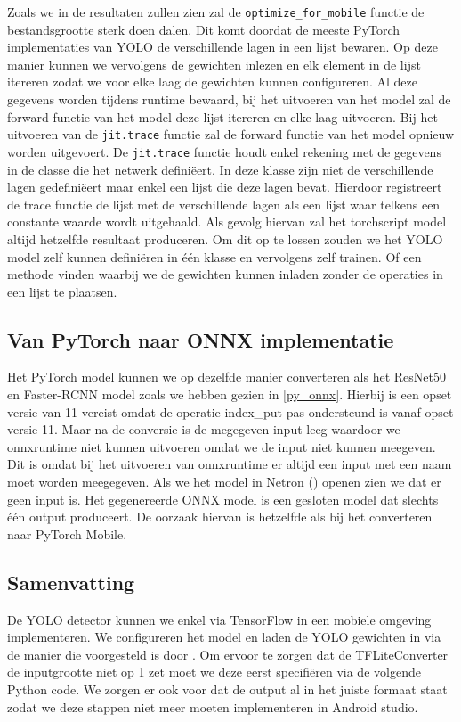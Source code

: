 Zoals we in de resultaten zullen zien zal de \texttt{optimize\_for\_mobile} functie de bestandsgrootte sterk doen dalen.
Dit komt doordat de meeste PyTorch implementaties van YOLO de verschillende lagen in een lijst bewaren.
Op deze manier kunnen we vervolgens de gewichten inlezen en elk element in de lijst itereren zodat we voor elke laag de gewichten kunnen configureren.
Al deze gegevens worden tijdens runtime bewaard, bij het uitvoeren van het model zal de forward functie van het model deze lijst itereren en elke laag uitvoeren.
Bij het uitvoeren van de \texttt{jit.trace} functie zal de forward functie van het model opnieuw worden uitgevoert.
De \texttt{jit.trace} functie houdt enkel rekening met de gegevens in de classe die het netwerk defini\"eert.
In deze klasse zijn niet de verschillende lagen gedefini\"eert maar enkel een lijst die deze lagen bevat.
Hierdoor registreert de trace functie de lijst met de verschillende lagen als een lijst waar telkens een constante waarde wordt uitgehaald.
Als gevolg hiervan zal het torchscript model altijd hetzelfde resultaat produceren.
Om dit op te lossen zouden we het YOLO model zelf kunnen defini\"eren in \'e\'en klasse en vervolgens zelf trainen.
Of een methode vinden waarbij we de gewichten kunnen inladen zonder de operaties in een lijst te plaatsen.

\subsection{Van PyTorch naar ONNX implementatie}
Het PyTorch model kunnen we op dezelfde manier converteren als het ResNet50 en Faster-RCNN model zoals we hebben gezien in \ref{py_onnx}.
Hierbij is een opset versie van 11 vereist omdat de operatie index\_put pas ondersteund is vanaf opset versie 11.
Maar na de conversie is de megegeven input leeg waardoor we onnxruntime niet kunnen uitvoeren omdat we de input niet kunnen meegeven.
Dit is omdat bij het uitvoeren van onnxruntime er altijd een input met een naam moet worden meegegeven.
Als we het model in Netron (\cite{roeder_lutzroedernetron_2022}) openen zien we dat er geen input is.
Het gegenereerde ONNX model is een gesloten model dat slechts \'e\'en output produceert.
De oorzaak hiervan is hetzelfde als bij het converteren naar PyTorch Mobile.

\subsection{Samenvatting}
De YOLO detector kunnen we enkel via TensorFlow in een mobiele omgeving implementeren.
We configureren het model en laden de YOLO gewichten in via de manier die voorgesteld is door \cite{anh_yolo3_2021}.
Om ervoor te zorgen dat de TFLiteConverter de inputgrootte niet op 1 zet moet we deze eerst specifi\"eren via de volgende Python code.
We zorgen er ook voor dat de output al in het juiste formaat staat zodat we deze stappen niet meer moeten implementeren in Android studio.


